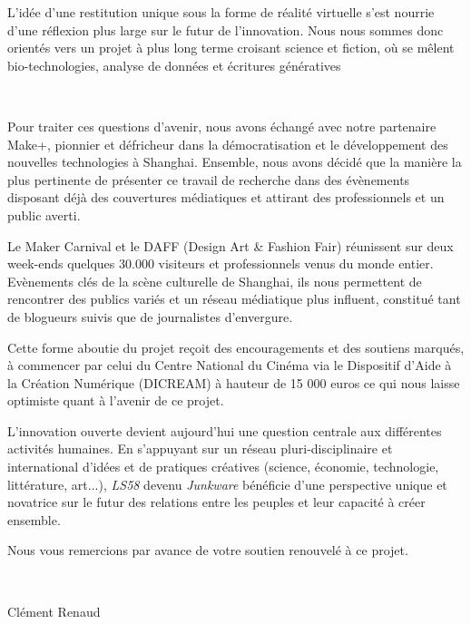 L{\textquoteright}id\'ee d{\textquoteright}une restitution unique sous
la forme de r\'ealit\'e virtuelle s{\textquoteright}est nourrie
d{\textquoteright}une r\'eflexion plus large sur le futur de
l{\textquoteright}innovation. Nous nous sommes donc orient\'es vers un
projet \`a plus long terme croisant science et fiction, o\`u se
m\^elent bio-technologies, analyse de donn\'ees et \'ecritures
g\'en\'eratives~

~

Pour traiter ces questions d{\textquoteright}avenir, nous avons
\'echang\'e avec notre partenaire Make+, pionnier et d\'efricheur dans
la d\'emocratisation et le d\'eveloppement des nouvelles technologies
\`a Shanghai. Ensemble, nous avons d\'ecid\'e que la mani\`ere la plus
pertinente de pr\'esenter ce travail de recherche dans des
\'ev\`enements disposant d\'ej\`a des couvertures m\'ediatiques et
attirant des professionnels et un public averti.

Le Maker Carnival et le DAFF (Design Art \& Fashion Fair) r\'eunissent
sur deux week-ends quelques 30.000 visiteurs et professionnels venus du
monde entier. Ev\`enements cl\'es de la sc\`ene culturelle de Shanghai,
ils nous permettent de rencontrer des publics vari\'es et un r\'eseau
m\'ediatique plus influent, constitu\'e tant de blogueurs suivis que de
journalistes d{\textquoteright}envergure.

Cette forme aboutie du projet re\c{c}oit des encouragements et des
soutiens marqu\'es, \`a commencer par celui du Centre National du
Cin\'ema via le Dispositif d{\textquoteright}Aide \`a la Cr\'eation
Num\'erique (DICREAM) \`a hauteur de 15 000 euros ce qui nous laisse
optimiste quant \`a l{\textquoteright}avenir de ce projet.

L{\textquoteright}innovation ouverte devient aujourd{\textquoteright}hui
une question centrale aux diff\'erentes activit\'es humaines. En
s{\textquoteright}appuyant sur un r\'eseau pluri-disciplinaire et
international d{\textquoteright}id\'ees et de pratiques cr\'eatives
(science, \'economie, technologie, litt\'erature, art...),
\textit{LS58 }devenu \textit{Junkware}
b\'en\'eficie d{\textquoteright}une perspective unique et novatrice sur
le futur des relations entre les peuples et leur capacit\'e \`a cr\'eer
ensemble.


\bigskip

Nous vous remercions par avance de votre soutien renouvel\'e \`a ce
projet.

~

Cl\'ement Renaud

